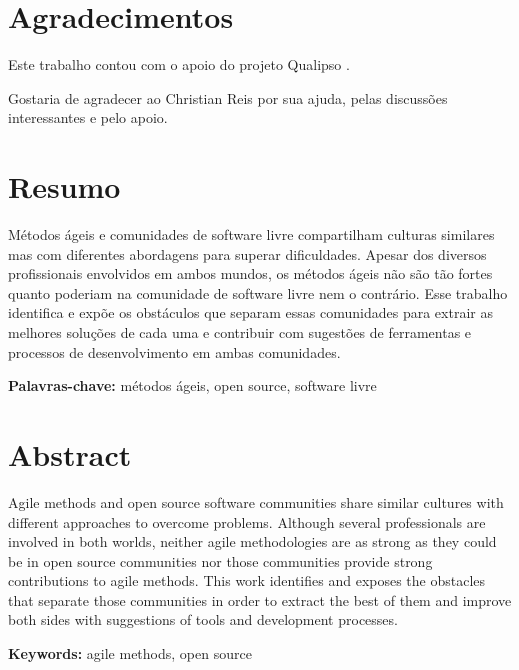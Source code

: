 \documentclass[12pt,twoside,letterpaper]{book}
\begin{document}

\chapter*{Agradecimentos}

Este trabalho contou com o apoio do projeto Qualipso \cite{Qualipso}.

Gostaria de agradecer ao Christian Reis por sua ajuda, pelas
discussões interessantes e pelo apoio.

\chapter*{Resumo}

Métodos ágeis e comunidades de software livre compartilham culturas
similares mas com diferentes abordagens para superar
dificuldades. Apesar dos diversos profissionais envolvidos em ambos
mundos, os métodos ágeis não são tão fortes quanto poderiam na
comunidade de software livre nem o contrário. Esse trabalho identifica
e expõe os obstáculos que separam essas comunidades para extrair as
melhores soluções de cada uma e contribuir com sugestões de
ferramentas e processos de desenvolvimento em ambas comunidades.

\noindent \textbf{Palavras-chave:} métodos ágeis, open source,
software livre

\chapter*{Abstract}

Agile methods and open source software communities share similar
cultures with different approaches to overcome problems. Although
several professionals are involved in both worlds, neither agile
methodologies are as strong as they could be in open source
communities nor those communities provide strong contributions to
agile methods. This work identifies and exposes the obstacles that
separate those communities in order to extract the best of them and
improve both sides with suggestions of tools and development
processes.

\noindent \textbf{Keywords:} agile methods, open source
\end{document}
